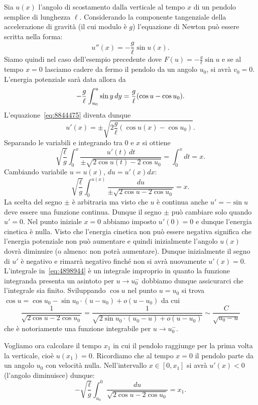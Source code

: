 \begin{example}
%
%
%
%
Sia $u(x)$
l'angolo di scostamento dalla verticale
al tempo $x$ di un pendolo semplice di lunghezza $\ell$.
Considerando la componente tangenziale della accelerazione di gravità
(il cui modulo è $g$)
l'equazione di Newton può essere scritta nella forma:
\[
  u''(x) = -\frac{g}{\ell} \sin u(x).
\]
Siamo quindi nel caso dell'esempio precedente dove $F(u) = -\frac{g}{\ell} \sin u$
e se al tempo $x=0$ lasciamo cadere da fermo il pendolo da un angolo $u_0$,
si avrà $v_0=0$. L'energia potenziale sarà data allora da
\[
-\frac{g}{\ell}\int_{u_0}^u \sin y\, dy = \frac{g}{\ell}{\left( \cos u - \cos u_0 \right)}.
\]
L'equazione~\eqref{eq:8844475} diventa dunque
\[
  u'(x) = \pm \sqrt{2\frac{g}{\ell}(\cos u(x) - \cos u_0)}.
\]
Separando le variabili e integrando tra $0$ e $x$ si ottiene
\[
\sqrt{\frac \ell g}\int_0^x \frac{u'(t)\, dt}{\pm\sqrt{2\cos u(t)-2\cos u_0}}
= \int_0^x dt  = x.
\]
Cambiando variabile $u=u(x)$, $du = u'(x) dx$:
\begin{equation}\label{eq:4898944}
\sqrt{\frac \ell g}\int_0^{u(x)} \frac{du}{\pm\sqrt{2\cos u-2\cos u_0}} = x.
\end{equation}
La scelta del segno $\pm$ è arbitraria ma visto che $u$ è continua
anche $u'=-\sin u$ deve essere una funzione continua. Dunque il segno
$\pm$ può cambiare solo quando $u'=0$. Nel punto iniziale $x=0$ abbiamo
imposto $u'(0) = 0$ e dunque l'energia cinetica è nulla. Visto che l'energia
cinetica non può essere negativa significa che l'energia potenziale
non può aumentare e quindi inizialmente l'angolo $u(x)$ dovrà diminuire
(o almeno: non potrà aumentare). Dunque inizialmente il segno di $u'$ è negativo
e rimarrà negativo finché non si avrà nuovamente $u'(x)=0$.
L'integrale in~\eqref{eq:4898944} è un integrale improprio in quanto
la funzione integranda presenta un asintoto per $u\to u_0^-$ dobbiamo dunque
assicurarci che l'integrale sia finito. Sviluppando $\cos u$ nel punto $u=u_0$
si trova $\cos u = \cos u_0  - \sin u_0 \cdot (u-u_0) + o(u-u_0)$ da cui
\[
 \frac{1}{\sqrt{2 \cos u - 2 \cos u_0}}
 =\frac{1}{\sqrt{2\sin u_0\cdot (u_0-u) + o(u-u_0)}}
 \sim \frac{C}{\sqrt{u_0-u}}
\]
che è notoriamente una funzione integrabile per $u\to u_0^-$.

Vogliamo ora calcolare il tempo $x_1$ in cui il pendolo raggiunge per la prima
volta la verticale, cioè $u(x_1)=0$.
Ricordiamo che al tempo $x=0$ il pendolo parte da un angolo $u_0$
con velocità nulla. Nell'intervallo $x\in[0,x_1]$ si avrà $u'(x)<0$
(l'angolo diminuisce) dunque:
\[
-\sqrt{\frac{\ell}{g}}\int_{u_0}^{0} \frac{du}{\sqrt{2\cos u - 2\cos u_0}}
= x_1.
\]


\end{example}
